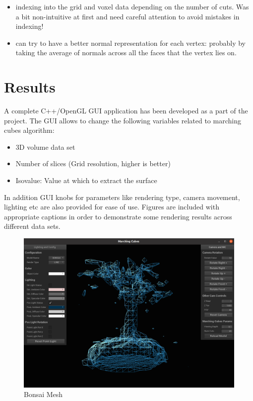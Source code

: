 \begin{itemize}
\tightlist
\item
  indexing into the grid and voxel data depending on the number of cuts.
  Was a bit non-intuitive at first and need careful attention to avoid
  mistakes in indexing!
\item
  can try to have a better normal representation for each vertex:
  probably by taking the average of normals across all the faces that
  the vertex lies on.
\end{itemize}

\hypertarget{results}{%
\section{Results}\label{results}}

A complete C++/OpenGL GUI application has been developed as a part of
the project. The GUI allows to change the following variables related to
marching cubes algorithm:

\begin{itemize}
\tightlist
\item
  3D volume data set
\item
  Number of slices (Grid resolution, higher is better)
\item
  Isovalue: Value at which to extract the surface
\end{itemize}

In addition GUI knobs for parameters like rendering type, camera
movement, lighting etc are also provided for ease of use. Figures are
included with appropriate captions in order to demonstrate some
rendering results across different data sets.

\begin{figure}
\centering
\includegraphics{./screenshots/meshing/bonsai_mesh.png}
\caption{Bonsai Mesh}
\end{figure}

